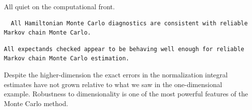 \documentclass[
  letterpaper,
  DIV=11,
  numbers=noendperiod]{scrartcl}
\newenvironment{Shaded}{\begin{snugshade}}{\end{snugshade}}
\newcommand{\AttributeTok}[1]{\textcolor[rgb]{0.40,0.45,0.13}{#1}}
\newcommand{\DecValTok}[1]{\textcolor[rgb]{0.68,0.00,0.00}{#1}}
\newcommand{\FunctionTok}[1]{\textcolor[rgb]{0.28,0.35,0.67}{#1}}
\newcommand{\NormalTok}[1]{\textcolor[rgb]{0.00,0.23,0.31}{#1}}
\newcommand{\OtherTok}[1]{\textcolor[rgb]{0.00,0.23,0.31}{#1}}
\newcommand{\SpecialCharTok}[1]{\textcolor[rgb]{0.37,0.37,0.37}{#1}}
\newcommand{\StringTok}[1]{\textcolor[rgb]{0.13,0.47,0.30}{#1}}
\begin{document}
All quiet on the computational front.

\begin{Shaded}
\end{Shaded}

\begin{verbatim}
  All Hamiltonian Monte Carlo diagnostics are consistent with reliable
Markov chain Monte Carlo.
\end{verbatim}

\begin{Shaded}
\end{Shaded}

\begin{verbatim}
All expectands checked appear to be behaving well enough for reliable
Markov chain Monte Carlo estimation.
\end{verbatim}

Despite the higher-dimension the exact errors in the normalization
integral estimates have not grown relative to what we saw in the
one-dimensional example. Robustness to dimensionality is one of the most
powerful features of the Monte Carlo method.

\begin{Shaded}
\end{Shaded}
\end{document}
